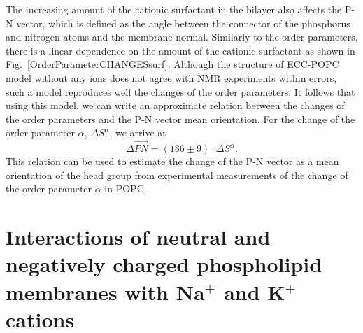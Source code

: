 The increasing amount of the cationic surfactant in the bilayer
also affects the P-N vector, 
which is defined as the angle between the connector of the phosphorus and nitrogen atoms and the membrane normal. 
Similarly to the order parameters, 
there is a linear dependence on the amount of the cationic surfactant
as shown in Fig.~\ref{OrderParameterCHANGESsurf}. 
Although the structure of ECC-POPC model without any ions does not agree with NMR experiments within errors,
such a model reproduces well the changes of the order parameters.
It follows that using this model,
we can write an approximate relation between the changes of the order parameters and the P-N vector mean orientation. 
For the change of the order parameter $\alpha$, $\Delta S^\alpha$, we arrive at
\begin{equation}
\Delta \vec{PN} = (186 \pm 9) \cdot \Delta S^\alpha .
\end{equation}
This relation can be used to estimate the change of the P-N vector as a mean orientation of the head group
from experimental measurements of the change of the order parameter $\alpha$ in POPC. 













\section{Interactions of neutral and negatively charged phospholipid membranes with Na$^+$ and K$^+$ cations}
\label{section:lip-ion_k_na}

